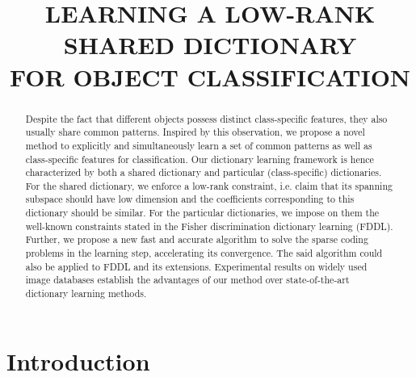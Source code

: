 \documentclass[letterpaper]{article}
\title{\vspace{-.2in}LEARNING A LOW-RANK SHARED DICTIONARY \\FOR OBJECT CLASSIFICATION\vspace{-0.1in}}
\begin{document}
\maketitle
\thispagestyle{fancy}
\pagestyle{empty}
\begin{abstract}
\vspace{0.1in}
\label{abstract}
Despite the fact that different objects possess distinct class-specific features, they also usually share common patterns. Inspired by this observation, we propose a novel method to explicitly and simultaneously learn a set of common patterns as well as class-specific features for classification. Our dictionary learning framework is hence characterized by both a shared dictionary and particular (class-specific) dictionaries. For the shared dictionary, we enforce a low-rank constraint, i.e. claim that its spanning subspace should have low dimension and the coefficients corresponding to this dictionary should be similar. For the particular dictionaries, we impose on them the well-known constraints stated in the Fisher discrimination dictionary learning (FDDL). Further, we propose a new fast and accurate algorithm to solve the sparse coding problems in the learning step, accelerating its convergence. The said algorithm could also be applied to FDDL and its extensions. Experimental results on widely used image databases establish the advantages of our method over state-of-the-art dictionary learning methods.

\end{abstract}


\vspace{-0.1in}
\section{Introduction}
\vspace{-0.1in}
\end{document}
